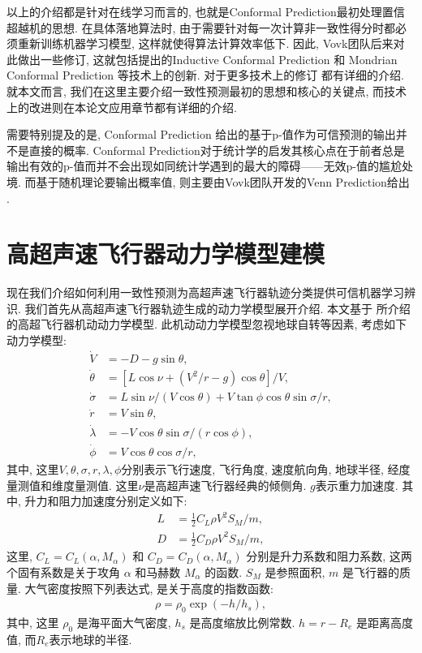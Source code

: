 \begin{remark}
以上的介绍都是针对在线学习而言的, 也就是Conformal Prediction最初处理置信超越机的思想. 在具体落地算法时, 由于需要针对每一次计算非一致性得分时都必须重新训练机器学习模型, 这样就使得算法计算效率低下. 因此, Vovk团队后来对此做出一些修订, 这就包括提出的Inductive Conformal Prediction \citep{Papadopoulos2008} 和 Mondrian Conformal Prediction \citep{Vovk-Mondrian-2003} 等技术上的创新. 对于更多技术上的修订 \citet[Chapter 4]{vovk2005algorithmic} 都有详细的介绍. 就本文而言, 我们在这里主要介绍一致性预测最初的思想和核心的关键点, 而技术上的改进则在本论文应用章节都有详细的介绍.
\end{remark}

\begin{remark}
需要特别提及的是, Conformal Prediction 给出的基于p-值作为可信预测的输出并不是直接的概率. Conformal Prediction对于统计学的启发其核心点在于前者总是输出有效的p-值而并不会出现如同统计学遇到的最大的障碍——无效p-值的尴尬处境. 而基于随机理论要输出概率值, 则主要由Vovk团队开发的Venn Prediction给出 \citep[Chapter 6, 9]{vovk2005algorithmic}.
\end{remark}

\section{高超声速飞行器动力学模型建模}
\label{sec:dynamic}

现在我们介绍如何利用一致性预测为高超声速飞行器轨迹分类提供可信机器学习辨识. 我们首先从高超声速飞行器轨迹生成的动力学模型展开介绍. 本文基于 \citet{Li2015} 所介绍的高超飞行器机动动力学模型. 此机动动力学模型忽视地球自转等因素, 考虑如下动力学模型:
\begin{align*}
\dot{V} &= -D - g\sin \theta,\\
\dot{\theta} &= [L\cos \nu + (V^2/r -g)\cos \theta]/V,\\
\dot{\sigma} &= L\sin \nu / (V \cos \theta) + V \tan \phi \cos \theta \sin \sigma / r,\\
\dot{r} &= V\sin \theta,\\
\dot{\lambda} &= -V \cos \theta \sin \sigma /(r \cos \phi),\\
\dot{\phi} &= V\cos\theta \cos \sigma /r,
\end{align*}
其中, 这里$V,\theta, \sigma, r, \lambda, \phi$分别表示飞行速度, 飞行角度, 速度航向角, 地球半径, 经度量测值和维度量测值. 这里$\nu$是高超声速飞行器经典的倾侧角. $g$表示重力加速度. 其中, 升力和阻力加速度分别定义如下:
\begin{align*}
L &= \frac{1}{2}C_{L}\rho V^{2}S_{M} / m,\\
D &= \frac{1}{2}C_{D}\rho V^{2}S_{M} / m,
\end{align*}
这里, $C_{L} = C_{L}(\alpha, M_{\alpha})$ 和 $C_{D} = C_{D}(\alpha,M_{\alpha})$ 分别是升力系数和阻力系数, 这两个固有系数是关于攻角 $\alpha$ 和马赫数 $M_{\alpha}$ 的函数. $S_M$ 是参照面积, $m$ 是飞行器的质量. 大气密度按照下列表达式, 是关于高度的指数函数:
\begin{align*}
\rho = \rho_0\exp(-h/h_s),
\end{align*}
其中, 这里 $\rho_0$ 是海平面大气密度, $h_s$ 是高度缩放比例常数. $h = r - R_e$ 是距离高度值, 而$R_e$表示地球的半径.

